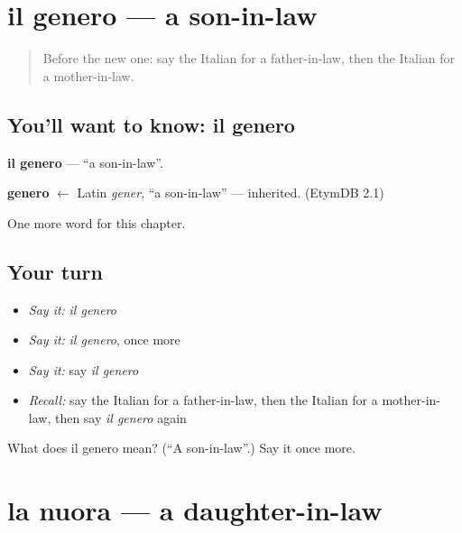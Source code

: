 \section[il genero]{il genero — a son-in-law}

\label{lesson:IT-C251-genero}



\begin{quote}
Before the new one: say the Italian for a father-in-law, then the Italian for a mother-in-law.
\end{quote}

\subsection*{You'll want to know: il genero}
\textbf{il genero} — \textquotedblleft{}a son-in-law\textquotedblright{}.

\begin{cousinweb}
\textbf{genero} $\leftarrow$ Latin \emph{gener}, \textquotedblleft{}a son-in-law\textquotedblright{} — inherited. (EtymDB 2.1)
\end{cousinweb}

\begin{grammarlens}[title={What you've built}]
One more word for this chapter.
\end{grammarlens}

\subsection*{Your turn}
\begin{itemize}
\raggedright
  \item \emph{Say it:} \emph{il genero}
  \item \emph{Say it:} \emph{il genero}, once more
  \item \emph{Say it:} say \emph{il genero}
  \item \emph{Recall:} say the Italian for a father-in-law, then the Italian for a mother-in-law, then say \emph{il genero} again
\end{itemize}

\begin{tcolorbox}[breakable,colback=teal!4,colframe=teal!35!black,title={Before you move on}]
What does il genero mean? (\textquotedblleft{}A son-in-law\textquotedblright{}.) Say it once more.
\end{tcolorbox}
\section[la nuora]{la nuora — a daughter-in-law}

